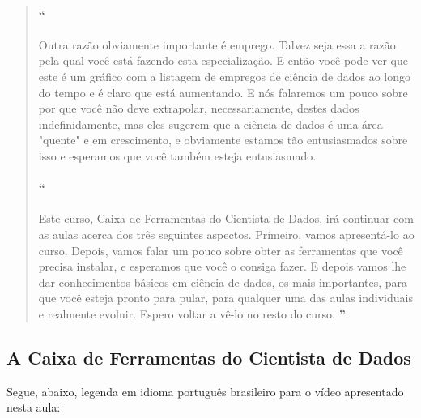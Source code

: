 \begin{quotation}
\begin{small}
\paragraph{``}
Outra razão obviamente importante é emprego. Talvez seja essa a razão pela qual você está fazendo esta especialização. E então você pode ver que este é um gráfico com a listagem de empregos de ciência de dados ao longo do tempo e é claro que está aumentando. E nós falaremos um pouco sobre por que você não deve extrapolar, necessariamente, destes dados indefinidamente, mas eles sugerem que  a ciência de dados é uma área "quente" e em crescimento, e obviamente estamos tão entusiasmados sobre isso e esperamos que você também esteja entusiasmado.

\paragraph{``}
Este curso, Caixa de Ferramentas do Cientista de Dados, irá continuar com as aulas acerca dos três seguintes aspectos. Primeiro, vamos apresentá-lo ao curso. Depois, vamos falar um pouco sobre obter as ferramentas que você precisa instalar, e esperamos que você o consiga fazer. E depois vamos lhe dar conhecimentos básicos em ciência de dados, os mais importantes, para que você esteja pronto para pular, para qualquer uma das aulas individuais e realmente evoluir. Espero voltar a vê-lo no resto do curso.
{\large \textbf{''}}
\end{small}
\end{quotation}


\subsection{A Caixa de Ferramentas do Cientista de Dados}

Segue, abaixo, legenda em idioma português brasileiro para o vídeo apresentado nesta aula:

